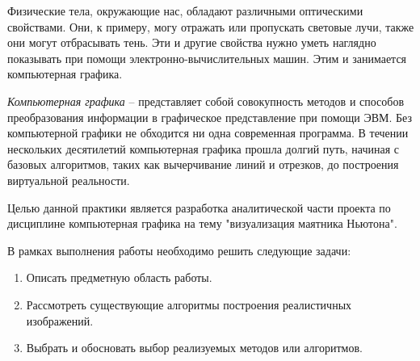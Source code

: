 \Introduction

Физические тела, окружающие нас, обладают различными оптическими свойствами. Они, к примеру, могу отражать или пропускать световые лучи, также они могут отбрасывать тень. Эти и другие свойства нужно уметь наглядно показывать при помощи электронно-вычислительных машин. Этим и занимается компьютерная графика.

\textit{Компьютерная графика} -- представляет собой совокупность методов и способов преобразования информации в графическое представление при помощи ЭВМ. Без компьютерной графики не обходится ни одна современная программа. В течении нескольких десятилетий компьютерная графика прошла долгий путь, начиная с базовых алгоритмов, таких как вычерчивание линий и отрезков, до построения виртуальной реальности. 

Целью данной практики является разработка аналитической части проекта по дисциплине компьютерная графика на тему "визуализация маятника Ньютона".

В рамках выполнения работы необходимо решить следующие задачи:
\begin{enumerate}
	\item Описать предметную область работы. 
	\item Рассмотреть существующие алгоритмы построения реалистичных изображений. 
	\item Выбрать и обосновать выбор реализуемых методов или алгоритмов. 
\end{enumerate}
